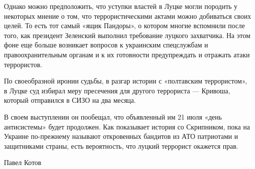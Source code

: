 Однако можно предположить, что уступки властей в Луцке могли породить у
некоторых мнение о том, что террористическими актами можно добиваться своих
целей. То есть тот самый «ящик Пандоры», о котором многие вспомнили после того,
как президент Зеленский выполнил требование луцкого захватчика. На этом фоне
еще больше возникает вопросов к украинским спецслужбам и правоохранительным
органам и к их готовности предупреждать и отражать атаки террористов. 

По своеобразной иронии судьбы, в разгар истории с «полтавским террористом», в
Луцке суд избирал меру пресечения для другого террориста --- Кривоша, который
отправился в СИЗО на два месяца. 

В своем выступлении он пообещал, что объявленный им 21 июля «день антисистемы»
будет продолжен. Как показывает история со Скрипником, пока на Украине
по-прежнему называют откровенных бандитов из АТО патриотами и защитниками
страны, есть вероятность, что луцкий террорист окажется прав.

Павел Котов
  
